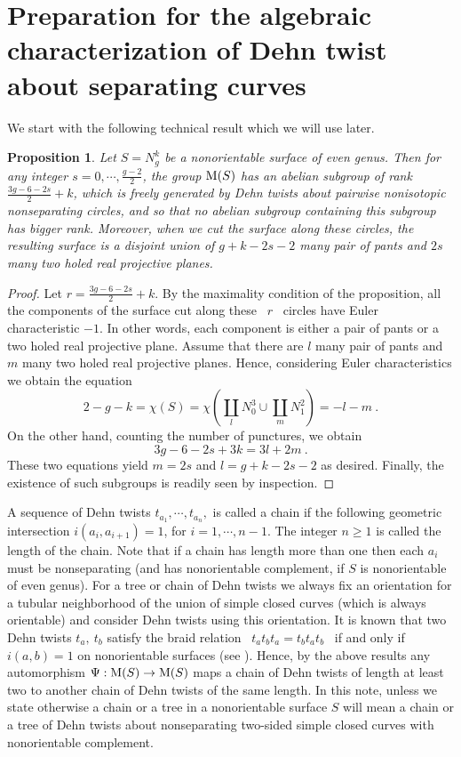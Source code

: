 \documentclass[11 pt]{amsart}
\newtheorem{Proposition}[Theorem]{Proposition}
\theoremstyle{definition}
\begin{document}
\section{Preparation for the algebraic characterization of Dehn
twist about separating curves}

We start with the following technical result which we will use
later.

\begin{Proposition}\label{Prop-MaxAbelSub}
Let $S=N_g^k$ be a nonorientable surface of even genus. Then for any
integer $s=0,\cdots, \frac{g-2}{2}$, the group ${\rm M}(S)$ has an
abelian subgroup of rank $\displaystyle\frac{3g-6-2s}{2} +
k$, which is freely generated by Dehn twists about pairwise
nonisotopic nonseparating circles, and so that no abelian subgroup
containing this subgroup has bigger rank. Moreover, when we cut the surface
along these circles, the resulting surface is a disjoint union of
$g+k-2s-2$ many pair of pants and $2s$ many two holed real
projective planes.
\end{Proposition}

\begin{proof}
Let $r=\displaystyle\frac{3g-6-2s}{2} + k$. By the
maximality condition of the proposition, all the components of
the surface cut along these \ $r$ \
circles have Euler characteristic $-1$.  In other words, each
component is either a pair of pants or a two holed real projective
plane.  Assume that there are $l$ many pair of pants and $m$ many
two holed real projective planes. Hence, considering Euler
characteristics we obtain the equation
$$2-g-k=\chi (S)=\chi (\coprod_l N_0^3 \cup \coprod_m N_1^2) =-l-m \ .$$
On the other hand, counting the number of punctures, we obtain
$$3g-6-2s+3k= 3l+2m \ .$$ These two equations yield $m=2s$ and
$l=g+k-2s-2$ as desired. Finally, the existence of such subgroups is
readily seen by inspection.
\end{proof}

\bigskip

A sequence of Dehn twists $t_{a_1},\cdots,t_{a_n},$ is called a
chain if the following geometric intersection $i(a_i,a_{i+1})=1$,
for $i=1,\cdots,n-1$. The integer $n\geq 1$ is called the length of
the chain. Note that if a chain has length more than one then each
$a_i$ must be nonseparating (and has nonorientable complement, if
$S$ is nonorientable of even genus). For a tree or chain of Dehn
twists we always fix an orientation for a tubular neighborhood of
the union of simple closed curves (which is always orientable) and
consider Dehn twists using this orientation. It is known that two
Dehn twists $t_a, \ t_b$ satisfy the braid relation \
$t_at_bt_a=t_bt_at_b$ \ if and only if $i(a,b)=1$ on nonorientable
surfaces (see \cite{SM1}). Hence, by the above results any
automorphism $\Psi:{\rm M}(S)\rightarrow {\rm M}(S)$ maps a chain of
Dehn twists of length at least two to another chain of Dehn twists
of the same length.  In this note, unless we state otherwise a chain
or a tree in a nonorientable surface $S$ will mean a chain or a tree
of Dehn twists about nonseparating two-sided simple closed curves
with nonorientable complement.
\end{document}
